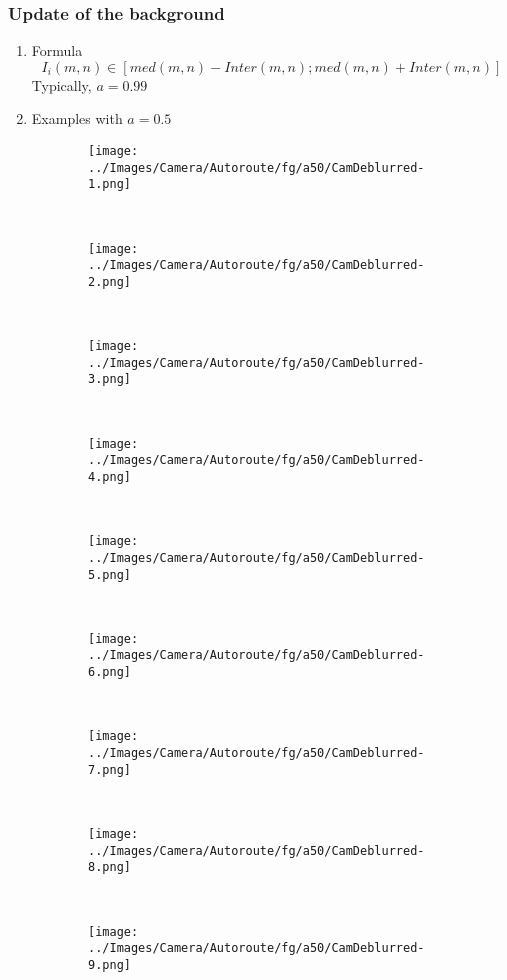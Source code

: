 \begin{frame}[allowframebreaks]
	\frametitle{Update of the background}
\begin{enumerate}
	\item Formula
	$$I_i (m,n) \in [med(m,n) - Inter(m,n); med(m,n) + Inter(m,n)]$$
	Typically, $a = 0.99$
	\item Examples with $a = 0.5$
\end{enumerate}
%	
\begin{figure}[h]
\centering
\begin{subfigure}{0.20\textwidth}
\texttt{[image: ../Images/Camera/Autoroute/fg/a50/CamDeblurred-1.png]}
\end{subfigure}
~
\begin{subfigure}{0.20\textwidth}
\texttt{[image: ../Images/Camera/Autoroute/fg/a50/CamDeblurred-2.png]}
\end{subfigure}
~
\begin{subfigure}{0.20\textwidth}
\texttt{[image: ../Images/Camera/Autoroute/fg/a50/CamDeblurred-3.png]}
\end{subfigure}
~
\begin{subfigure}{0.20\textwidth}
\texttt{[image: ../Images/Camera/Autoroute/fg/a50/CamDeblurred-4.png]}
\end{subfigure}
~
\begin{subfigure}{0.20\textwidth}
\texttt{[image: ../Images/Camera/Autoroute/fg/a50/CamDeblurred-5.png]}
\end{subfigure}
~
\begin{subfigure}{0.20\textwidth}
\texttt{[image: ../Images/Camera/Autoroute/fg/a50/CamDeblurred-6.png]}
\end{subfigure}
~
\begin{subfigure}{0.20\textwidth}
\texttt{[image: ../Images/Camera/Autoroute/fg/a50/CamDeblurred-7.png]}
\end{subfigure}
~
\begin{subfigure}{0.20\textwidth}
\texttt{[image: ../Images/Camera/Autoroute/fg/a50/CamDeblurred-8.png]}
\end{subfigure}
~
\begin{subfigure}{0.20\textwidth}
\texttt{[image: ../Images/Camera/Autoroute/fg/a50/CamDeblurred-9.png]}
\end{subfigure}
~
\begin{subfigure}{0.20\textwidth}

\end{subfigure}
\end{figure}
\end{frame}
